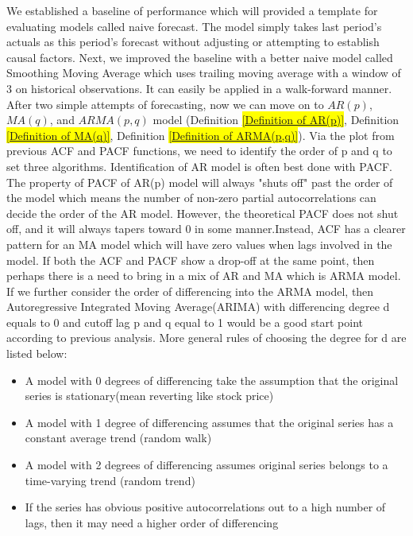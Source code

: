 \indent We established a baseline of performance which will provided a template for evaluating models called naive forecast. The model simply takes last period's actuals as this period's forecast without adjusting or attempting to establish causal factors. Next, we improved the baseline with a better naive model called Smoothing Moving Average which uses trailing moving average with a window of 3 on historical observations. It can easily be applied in a walk-forward manner. After two simple attempts of forecasting, now we can move on to $AR(p)$, $MA(q)$, and $ARMA(p,q)$ model (Definition \hl{\ref{Definition of AR(p)}}, Definition \hl{\ref{Definition of MA(q)}}, Definition \hl{\ref{Definition of ARMA(p,q)}}). Via the plot from previous ACF and PACF functions, we need to identify the order of p and q to set three algorithms. Identification of AR model is often best done with PACF. The property of PACF of AR(p) model will always "shuts off" past the order of the model which means the number of non-zero partial autocorrelations can decide the order of the AR model. However, the theoretical PACF does not shut off, and it will always tapers toward 0 in some manner.Instead, ACF has a clearer pattern for an MA model which will have zero values when lags involved in the model. If both the ACF and PACF show a drop-off at the same point, then perhaps there is a need to bring in a mix of AR and MA which is ARMA model. If we further consider the order of differencing into the ARMA model, then Autoregressive Integrated Moving Average(ARIMA) with differencing degree d equals to 0 and cutoff lag p and q equal to 1 would be a good start point according to previous analysis. More general rules of choosing the degree for d are listed below:
 \begin{itemize}
    \item A model with 0 degrees of differencing take the assumption that the original series is stationary(mean reverting like stock price) 
    \item A model with 1 degree of differencing assumes that the original series has a constant average trend (random walk)
    \item A model with 2 degrees of differencing assumes original series belongs to a time-varying trend (random trend)
    \item If the series has obvious positive autocorrelations out to a high number of lags, then it may need a higher order of differencing
 \end{itemize}
